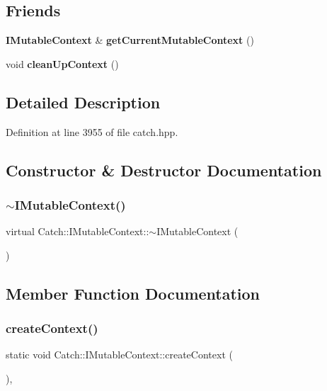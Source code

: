 \subsection*{Friends}
\begin{DoxyCompactItemize}
\item 
\textbf{ I\+Mutable\+Context} \& \textbf{ get\+Current\+Mutable\+Context} ()
\item 
void \textbf{ clean\+Up\+Context} ()
\end{DoxyCompactItemize}


\subsection{Detailed Description}


Definition at line 3955 of file catch.\+hpp.



\subsection{Constructor \& Destructor Documentation}
\mbox{\label{struct_catch_1_1_i_mutable_context_a93f32b2ab6d0fb83637059240be799ab}} 
\subsubsection{$\sim$IMutableContext()}
{\footnotesize\ttfamily virtual Catch\+::\+I\+Mutable\+Context\+::$\sim$\+I\+Mutable\+Context (\begin{DoxyParamCaption}{ }\end{DoxyParamCaption})\hspace{0.3cm}{\ttfamily [virtual]}}



\subsection{Member Function Documentation}
\mbox{\label{struct_catch_1_1_i_mutable_context_a17e4b3f9a9674af7e2c4f081c692a628}} 
\subsubsection{createContext()}
{\footnotesize\ttfamily static void Catch\+::\+I\+Mutable\+Context\+::create\+Context (\begin{DoxyParamCaption}{ }\end{DoxyParamCaption})\hspace{0.3cm}{\ttfamily [static]}, {\ttfamily [private]}}

